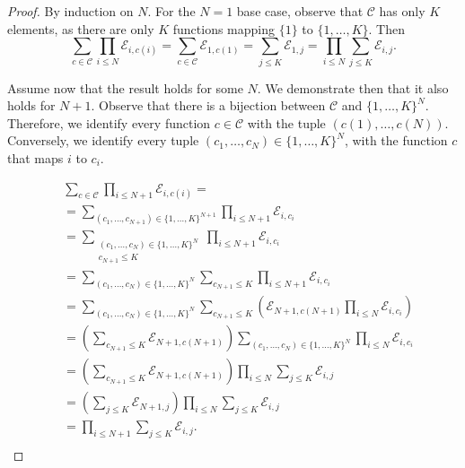 \begin{proof}
By induction on $N$. For the $N=1$ base case, observe that $\mathcal{C}$ has only $K$ elements, as there are only $K$ functions mapping $\{1\}$ to $\{1, \ldots, K\}$. Then
$$
\sum_{c \in \mathcal{C}} \prod_{i \leq N} \mathcal{E}_{i, c(i)}=\sum_{c \in \mathcal{C}} \mathcal{E}_{1, c(1)}=\sum_{j \leq K} \mathcal{E}_{1, j}=\prod_{i \leq N} \sum_{j \leq K} \mathcal{E}_{i, j} .
$$

Assume now that the result holds for some $N$. We demonstrate then that it also holds for $N+1$. Observe that there is a bijection between $\mathcal{C}$ and $\{1, \ldots, K\}^N$. Therefore, we identify every function $c \in \mathcal{C}$ with the tuple $(c(1), \ldots, c(N))$. Conversely, we identify every tuple $\left(c_1, \ldots, c_N\right) \in\{1, \ldots, K\}^N$, with the function $c$ that maps $i$ to $c_i$.

$$
\begin{aligned}
    & \sum_{c \in \mathcal{C}} \prod_{i \leq N+1} \mathcal{E}_{i, c(i)}= \\
    & =\sum_{\left(c_1, \ldots, c_{N+1}\right) \in\{1, \ldots, K\}^{N+1}} \prod_{i \leq N+1} \mathcal{E}_{i, c_i} \\
    & =\sum_{\substack{\left(c_1, \ldots, c_N\right) \in\{1, \ldots, K\}^N \\
    c_{N+1} \leq K}} \prod_{i \leq N+1} \mathcal{E}_{i, c_i} \\
    & =\sum_{\left(c_1, \ldots, c_N\right) \in\{1, \ldots, K\}^N} \sum_{c_{N+1} \leq K} \prod_{i \leq N+1} \mathcal{E}_{i, c_i} \\
    & =\sum_{\left(c_1, \ldots, c_N\right) \in\{1, \ldots, K\}^N} \sum_{c_{N+1} \leq K}\left(\mathcal{E}_{N+1, c(N+1)} \prod_{i \leq N} \mathcal{E}_{i, c_i}\right) \\
    & =\left(\sum_{c_{N+1} \leq K} \mathcal{E}_{N+1, c(N+1)}\right) \sum_{\left(c_1, \ldots, c_N\right) \in\{1, \ldots, K\}^N} \prod_{i \leq N} \mathcal{E}_{i, c_i} \\
    & =\left(\sum_{c_{N+1} \leq K} \mathcal{E}_{N+1, c(N+1)}\right) \prod_{i \leq N} \sum_{j \leq K} \mathcal{E}_{i, j} \\
    & =\left(\sum_{j \leq K} \mathcal{E}_{N+1, j}\right) \prod_{i \leq N} \sum_{j \leq K} \mathcal{E}_{i, j} \\
    & =\prod_{i \leq N+1} \sum_{j \leq K} \mathcal{E}_{i, j} . \\
    &
    \end{aligned}
$$
\end{proof}


